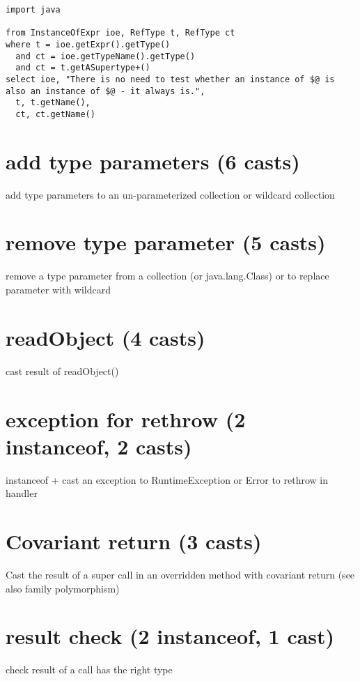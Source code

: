 \documentclass{usiinfdocprop}
\begin{document}
\lstset{language=ql,label= ,caption= ,captionpos=b,numbers=none}
\begin{lstlisting}
import java

from InstanceOfExpr ioe, RefType t, RefType ct
where t = ioe.getExpr().getType()
  and ct = ioe.getTypeName().getType()
  and ct = t.getASupertype+()
select ioe, "There is no need to test whether an instance of $@ is also an instance of $@ - it always is.",
  t, t.getName(),
  ct, ct.getName()
\end{lstlisting}

\section{add type parameters (6 casts)}
\label{sec:orge3b84b3}
add type parameters to an un-parameterized collection or wildcard collection 

\section{remove type parameter (5 casts)}
\label{sec:orgdccbc41}
remove a type parameter from a collection (or java.lang.Class) or to replace parameter with wildcard 

\section{readObject (4 casts)}
\label{sec:org1c30fc6}
cast result of readObject() 

\section{exception for rethrow (2 instanceof, 2 casts)}
\label{sec:orgcdb3caa}

instanceof + cast an exception to RuntimeException or Error to rethrow in handler 

\section{Covariant return (3 casts)}
\label{sec:org46f23f9}

Cast the result of a super call in an overridden method with covariant return 
(see also family polymorphism) 

\section{result check (2 instanceof, 1 cast)}
\label{sec:org7367720}
check result of a call has the right type 
\end{document}
